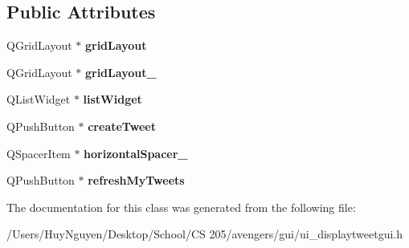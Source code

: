 \subsection*{Public Attributes}
\begin{DoxyCompactItemize}
\item 
Q\+Grid\+Layout $\ast$ {\bfseries grid\+Layout}\hypertarget{classUi__DisplayTweetGUI_a1736c835bf50836d6267371a98cc64ea}{}\label{classUi__DisplayTweetGUI_a1736c835bf50836d6267371a98cc64ea}

\item 
Q\+Grid\+Layout $\ast$ {\bfseries grid\+Layout\+\_}\hypertarget{classUi__DisplayTweetGUI_a05eaed6f146e5546d48873f63082661b}{}\label{classUi__DisplayTweetGUI_a05eaed6f146e5546d48873f63082661b}

\item 
Q\+List\+Widget $\ast$ {\bfseries list\+Widget}\hypertarget{classUi__DisplayTweetGUI_aa9ff04b26c101ca4d10341c852f98b84}{}\label{classUi__DisplayTweetGUI_aa9ff04b26c101ca4d10341c852f98b84}

\item 
Q\+Push\+Button $\ast$ {\bfseries create\+Tweet}\hypertarget{classUi__DisplayTweetGUI_a41f1854eba4662a77635a21497bcc581}{}\label{classUi__DisplayTweetGUI_a41f1854eba4662a77635a21497bcc581}

\item 
Q\+Spacer\+Item $\ast$ {\bfseries horizontal\+Spacer\+\_}\hypertarget{classUi__DisplayTweetGUI_a60e19780d643ecf003d6810bc5537ff1}{}\label{classUi__DisplayTweetGUI_a60e19780d643ecf003d6810bc5537ff1}

\item 
Q\+Push\+Button $\ast$ {\bfseries refresh\+My\+Tweets}\hypertarget{classUi__DisplayTweetGUI_a6a3d54c89916cfd30cdf38dfbc8d5db6}{}\label{classUi__DisplayTweetGUI_a6a3d54c89916cfd30cdf38dfbc8d5db6}

\end{DoxyCompactItemize}


The documentation for this class was generated from the following file\+:\begin{DoxyCompactItemize}
\item 
/\+Users/\+Huy\+Nguyen/\+Desktop/\+School/\+C\+S 205/avengers/gui/ui\+\_\+displaytweetgui.\+h\end{DoxyCompactItemize}
